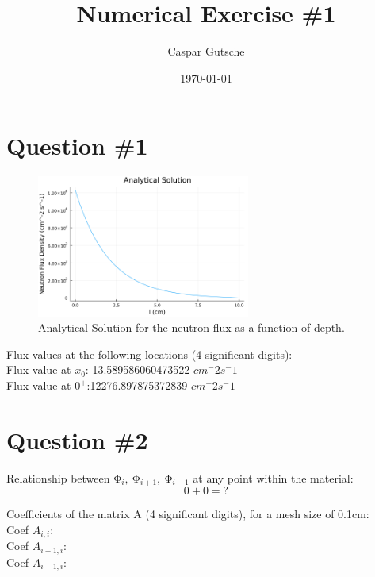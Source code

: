 \documentclass[11pt,a4paper]{article}
\begin{document}
\title{Numerical Exercise \#1}
\author{Caspar Gutsche\\  %
}
\date{\today}
\maketitle



\newpage
\section{Question \#1}
\begin{figure}[h]
\includegraphics[width=7cm]{../figs/ex1_analytical.png}
\centering
\caption{Analytical Solution for the neutron flux as a function of depth.}
\end{figure}
Flux values at the following locations (4 significant digits):\\
Flux value at $x_0$: 13.589586060473522 $cm^-2 s^-1$\\
Flux value at $0^+$:12276.897875372839  $cm^-2 s^-1$ \\


\section{Question \#2}

Relationship between $\mathrm{\Phi}_i,\ \mathrm{\Phi}_{i+1},\ \mathrm{\Phi}_{i-1}$ at any point within the material:
\begin{equation}
    0+0=?
\end{equation}

Coefficients of the matrix A (4 significant digits), for a mesh size of 0.1cm:\\
Coef $A_{i,i}$: \\
Coef $A_{i-1,i}$: \\
Coef $A_{i+1,i}$: \\
\end{document}
